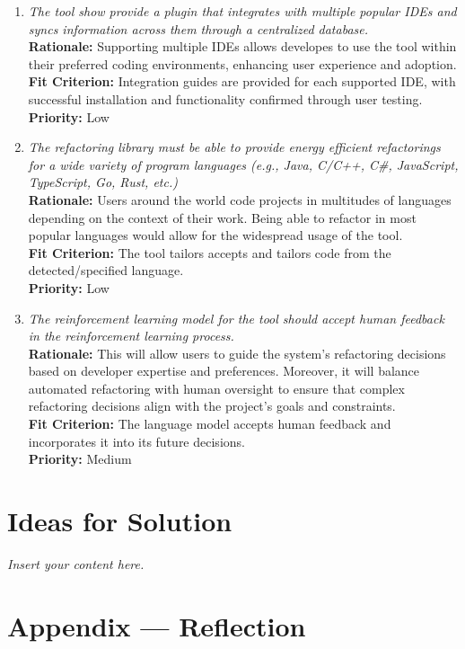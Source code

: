 \documentclass[12pt]{article}
\newcommand{\lips}{\textit{Insert your content here.}}
\begin{document}
\begin{enumerate}[label=WTRM \arabic*., wide=0pt, leftmargin=*]
    {\bf Priority:} High
  \item \emph{The tool show provide a plugin that integrates with multiple popular IDEs and syncs information across them through a centralized database.}\\[2mm]
    {\bf Rationale:} Supporting multiple IDEs allows developes to use the tool within their preferred coding environments, enhancing user experience and adoption.\\
    {\bf Fit Criterion:} Integration guides are provided for each supported IDE, with successful installation and functionality confirmed through user testing.\\
    {\bf Priority:} Low
  \item \emph{The refactoring library must be able to provide energy efficient refactorings for a wide variety of program languages (e.g., Java, C/C++, C\#, JavaScript, TypeScript, Go, Rust, etc.)}\\[2mm]
    {\bf Rationale:} Users around the world code projects in multitudes of languages depending on the context of their work. Being able to refactor in most popular languages would allow for the widespread usage of the tool.\\
    {\bf Fit Criterion:} The tool tailors accepts and tailors code from the detected/specified language.\\
    {\bf Priority:} Low
  \item \emph{The reinforcement learning model for the tool should accept human feedback in the reinforcement learning process.}\\[2mm]
    {\bf Rationale:} This will allow users to guide the system's refactoring decisions based on developer expertise and preferences. Moreover, it will balance automated refactoring with human oversight to ensure that complex refactoring decisions align with the project's goals and constraints.\\
    {\bf Fit Criterion:} The language model accepts human feedback and incorporates it into its future decisions.\\
    {\bf Priority:} Medium
\end{enumerate}

\section{Ideas for Solution}
\lips

\newpage{}
\section*{Appendix --- Reflection}
\end{document}

